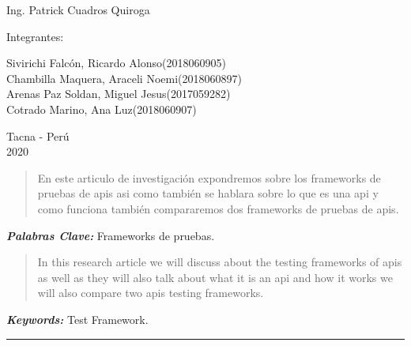 \documentclass{article}
\providecommand{\keywords}[1]{
  \small	
  \textbf{\textit{\quad \quad Keywords: }} #1}
\providecommand{\pclave}[1]{
  \small	
  \textbf{\textit{\quad \quad Palabras Clave: }} #1}
\begin{document}
\begin{titlepage}
\begin{center}
\vspace*{0.1in}
\begin{large}
 Ing. Patrick Cuadros Quiroga\\
\end{large}

\vspace*{0.2in}
\vspace*{0.1in}
\begin{large}

Integrantes: \\
\begin{flushleft}
Sivirichi Falcón, Ricardo Alonso\hfill(2018060905) \\
Chambilla Maquera, Araceli Noemi\hfill(2018060897)\\
Arenas Paz Soldan, Miguel Jesus\hfill(2017059282)\\
Cotrado Marino, Ana Luz\hfill(2018060907)\\

\end{flushleft}
\end{large}

\vspace*{0.1in}
\begin{large}
Tacna - Perú\\
2020
\end{large}
\end{center}
\end{titlepage}

\begin{abstract}
\quad En este articulo de investigación expondremos sobre los frameworks de pruebas de
apis asi como también se hablara sobre lo que es
una api y como funciona también compararemos
dos frameworks de pruebas de apis.

\end{abstract}
\pclave{Frameworks de pruebas.}

\begin{abstract}
\quad In this research article we will discuss about the testing frameworks of
apis as well as they will also talk about what it is
an api and how it works we will also compare
two apis testing frameworks.

\end{abstract}
\keywords{Test Framework.}

\begin{center}\rule{1\textwidth}{0.05mm} \end{center}
\end{document}

